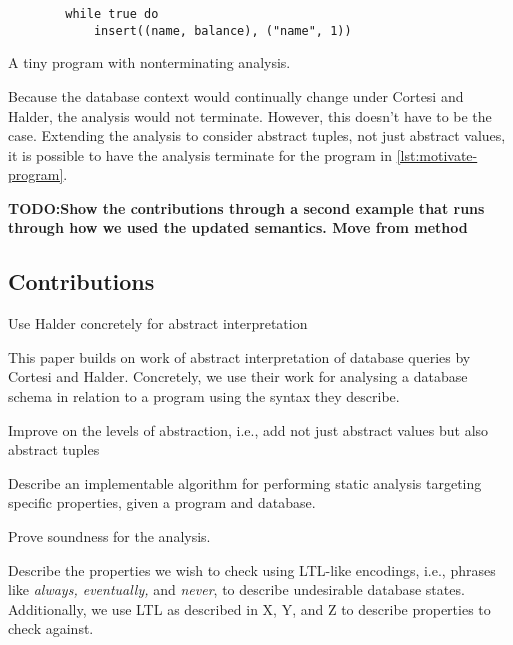 \begin{listing}
    \begin{verbatim}
        while true do
            insert((name, balance), ("name", 1))
    \end{verbatim}
    \caption{A tiny program with nonterminating analysis.}
    \label{lst:motivate-program}
\end{listing}


Because the database context would continually change under Cortesi and Halder, the analysis would not terminate.
However, this doesn't have to be the case.
Extending the analysis to consider abstract tuples, not just abstract values, it is possible to have the analysis terminate for the program in \autoref{lst:motivate-program}.

\textbf{TODO:Show the contributions through a second example that runs through how we used the updated semantics. Move from method}


\subsection{Contributions}\label{subsec:contributions}

Use Halder concretely for abstract interpretation

This paper builds on work of abstract interpretation of database queries by Cortesi and Halder.
Concretely, we use their work for analysing a database schema in relation to a program using the syntax they describe.


Improve on the levels of abstraction, i.e., add not just abstract values but also abstract tuples

Describe an implementable algorithm for performing static analysis targeting specific properties, given a program and database.

Prove soundness for the analysis.

Describe the properties we wish to check using LTL-like encodings, i.e., phrases like \emph{always, eventually,} and \emph{never}, to describe undesirable database states.
Additionally, we use LTL as described in X, Y, and Z to describe properties to check against.



